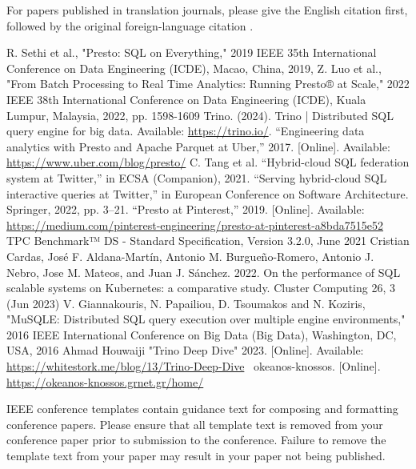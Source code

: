 \documentclass[conference]{IEEEtran}
\begin{document}
For papers published in translation journals, please give the English
citation first, followed by the original foreign-language citation \cite{b6}.

\begin{thebibliography}{00}
	 R. Sethi et al., "Presto: SQL on Everything," 2019 IEEE 35th International Conference on Data Engineering (ICDE), Macao, China, 2019,
	 Z. Luo et al., "From Batch Processing to Real Time Analytics: Running Presto® at Scale," 2022 IEEE 38th International Conference on Data Engineering (ICDE), Kuala Lumpur, Malaysia, 2022, pp. 1598-1609
	 Trino. (2024). Trino | Distributed SQL query engine for big data. Available: \href{https://trino.io/}{https://trino.io/}.
	 “Engineering data analytics with Presto and Apache Parquet at Uber,” 2017. [Online]. Available: \href{https://www.uber.com/blog/presto/}{https://www.uber.com/blog/presto/}
	 C. Tang et al. “Hybrid-cloud SQL federation system at Twitter,” in ECSA (Companion), 2021.
	 “Serving hybrid-cloud SQL interactive queries at Twitter,” in European Conference on Software Architecture. Springer, 2022, pp. 3–21.
	 “Presto at Pinterest,” 2019. [Online]. Available: \href{https://medium.com/pinterest-engineering/presto-at-pinterest-a8bda7515e52}{https://medium.com/pinterest-engineering/presto-at-pinterest-a8bda7515e52}
	 TPC Benchmark™ DS - Standard Specification, Version 3.2.0, June 2021
	 Cristian Cardas, José F. Aldana-Martín, Antonio M. Burgueño-Romero, Antonio J. Nebro, Jose M. Mateos, and Juan J. Sánchez. 2022. On the performance of SQL scalable systems on Kubernetes: a comparative study. Cluster Computing 26, 3 (Jun 2023)
	 V. Giannakouris, N. Papailiou, D. Tsoumakos and N. Koziris, "MuSQLE: Distributed SQL query execution over multiple engine environments," 2016 IEEE International Conference on Big Data (Big Data), Washington, DC, USA, 2016
	 Ahmad Houwaiji "Trino Deep Dive" 2023. [Online]. Available: \href{https://whitestork.me/blog/13/Trino-Deep-Dive}{https://whitestork.me/blog/13/Trino-Deep-Dive}
	 ~okeanos-knossos. [Online]. \href{https://okeanos-knossos.grnet.gr/home/}{https://okeanos-knossos.grnet.gr/home/}
\end{thebibliography}
\vspace{12pt}
\color{red}
IEEE conference templates contain guidance text for composing and formatting conference papers. Please ensure that all template text is removed from your conference paper prior to submission to the conference. Failure to remove the template text from your paper may result in your paper not being published.
\end{document}
